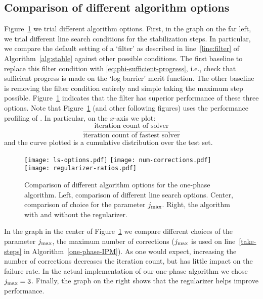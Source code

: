 \documentclass{article}
\begin{document}
\subsection{Comparison of different algorithm options}\label{alg:comparison-options}




Figure~\ref{fig:alg-options} we trial different algorithm options. First, in the graph on the far left, we trial different line search conditions for the stabilization steps. In particular, we compare the default setting of a `filter' as described in line~\ref{line:filter} of Algorithm~\ref{alg:stable} against other possible conditions. The first baseline to replace this filter condition with  \eqref{eq:phi-sufficient-progress}, i.e., check that sufficient progress is made on the `log barrier' merit function. The other baseline is removing the filter condition entirely and simple taking the maximum step possible. Figure~\ref{fig:alg-options} indicates that the filter has superior performance of these three options. Note that Figure~\ref{fig:alg-options} (and other following figures) uses the performance profiling of \citet*{dolan2002benchmarking}. In particular, on the $x$-axis we plot:
$$
\frac{\text{iteration count of solver}}{\text{iteration count of fastest solver}}
$$
and the curve plotted is a cumulative distribution over the test set.

\begin{figure}[H]
\texttt{[image: ls-options.pdf]}
\texttt{[image: num-corrections.pdf]}
\texttt{[image: regularizer-ratios.pdf]}
\caption{Comparison of different algorithm options for the one-phase algorithm. Left, comparison of different line search options. Center, comparison of choice for the parameter $j_{\max}$. Right, the algorithm with and without the regularizer.}
\label{fig:alg-options}
\end{figure}

In the graph in the center of Figure~\ref{fig:alg-options} we compare different choices of the parameter $j_{\max}$, the maximum number of corrections ($j_{\max}$ is used on line~\ref{take-steps} in Algorithm~\ref{one-phase-IPM}). As one would expect, increasing the number of corrections decreases the iteration count, but has little impact on the failure rate. In the actual implementation of our one-phase algorithm we chose $j_{\max}=3$. Finally, the graph on the right shows that the regularizer helps improve performance.
\end{document}

